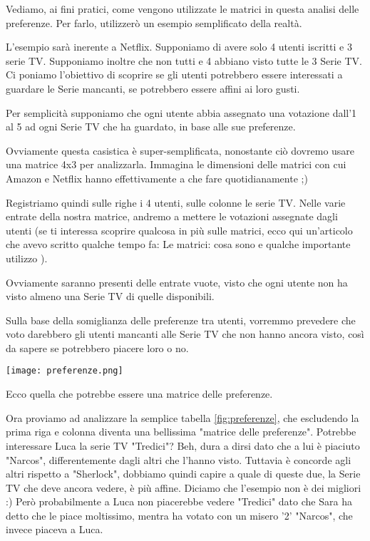 Vediamo, ai fini pratici, come vengono utilizzate le matrici in questa analisi delle preferenze. Per farlo, utilizzerò un esempio semplificato della realtà.

L'esempio sarà inerente a Netflix. Supponiamo di avere solo 4 utenti iscritti e 3 serie TV. Supponiamo inoltre che non tutti e 4 abbiano visto tutte le 3 Serie TV. Ci poniamo l'obiettivo di scoprire se gli utenti potrebbero essere interessati a guardare le Serie mancanti, se potrebbero essere affini ai loro gusti.

Per semplicità supponiamo che ogni utente abbia assegnato una votazione dall'1 al 5 ad ogni Serie TV che ha guardato, in base alle sue preferenze.

Ovviamente questa casistica è super-semplificata, nonostante ciò dovremo usare una matrice 4x3 per analizzarla. Immagina le dimensioni delle matrici con cui Amazon e Netflix hanno effettivamente a che fare quotidianamente ;)

Registriamo quindi sulle righe i 4 utenti, sulle colonne le serie TV. Nelle varie entrate della nostra matrice, andremo a mettere le votazioni assegnate dagli utenti (se ti interessa scoprire qualcosa in più sulle matrici, ecco qui un'articolo che avevo scritto qualche tempo fa: Le matrici: cosa sono e qualche importante utilizzo ).

Ovviamente saranno presenti delle entrate vuote, visto che ogni utente non ha visto almeno una Serie TV di quelle disponibili.

Sulla base della somiglianza delle preferenze tra utenti, vorremmo prevedere che voto darebbero gli utenti mancanti alle Serie TV che non hanno ancora visto, così da sapere se potrebbero piacere loro o no.


\begin{marginfigure}%
	\texttt{[image: preferenze.png]}
	\caption{Ecco quella che potrebbe essere una matrice delle preferenze.}
	\label{fig:preferenze}
\end{marginfigure}


Ora proviamo  ad analizzare la semplice tabella \ref{fig:preferenze}, che escludendo la prima riga e colonna diventa una bellissima "matrice delle preferenze".
Potrebbe interessare Luca la serie TV "Tredici"? Beh, dura a dirsi dato che a lui è piaciuto "Narcos", differentemente dagli altri che l'hanno visto. Tuttavia è concorde agli altri rispetto a "Sherlock", dobbiamo quindi capire a quale di queste due, la Serie TV che deve ancora vedere, è più affine. Diciamo che l'esempio non è dei migliori :)
Però probabilmente a Luca non piacerebbe vedere "Tredici" dato che Sara ha detto che le piace moltissimo, mentra ha votato con un misero '2' "Narcos", che invece piaceva a Luca.

